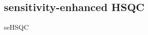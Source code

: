 \subsection{\texorpdfstring{\nitrogen{}}{15N} sensitivity-enhanced HSQC}
\label{subsec:noah__sehsqc_n}

\nitrogen{} seHSQC

